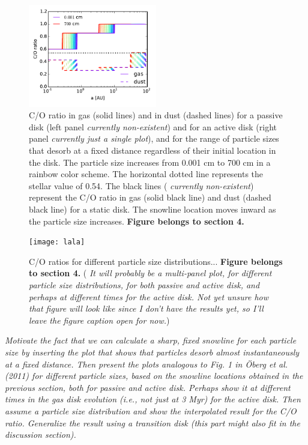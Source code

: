 \documentclass[apj]{emulateapj}
\newcommand{\emgr}[1]{\emph{ \color{gray} #1}}
\begin{document}
\begin{figure}[h!]
\centering
\includegraphics[width=0.5\textwidth]{../../figs/C_O_ratio_active_disk_many.pdf}
\caption{C/O ratio in gas (solid lines) and in dust (dashed lines) for a passive disk (left panel \emgr{currently non-existent}) and for an active disk (right panel \emgr{currently just a single plot}), and for the range of particle sizes that desorb at a fixed distance regardless of their initial location in the disk. The particle size increases from 0.001 cm to 700 cm in a rainbow color scheme. The horizontal dotted line represents the stellar value of 0.54. The black lines (\emgr{currently non-existent}) represent the C/O ratio in gas (solid black line) and dust (dashed black line) for a static disk. The snowline location moves inward as the particle size increases. \textbf{Figure belongs to section 4.}}
\label{fig:CO_ratio}
\end{figure}

\begin{figure}[h!]
\centering
\texttt{[image: lala]}
\caption{C/O ratios for different particle size distributions... \textbf{Figure belongs to section 4.} (\emgr{It will probably be a multi-panel plot, for different particle size distributions, for both passive and active disk, and perhaps at different times for the active disk. Not yet unsure how that figure will look like since I don't have the results yet, so I'll leave the figure caption open for now.})}
\label{fig:...}
\end{figure}

\emgr{Motivate the fact that we can calculate a sharp, fixed snowline for each particle size by inserting the plot that shows that particles desorb almost instantaneously at a fixed distance.  Then present the plots analogous to Fig. 1 in \"Oberg et al. (2011) for different particle sizes, based on the snowline locations obtained in the previous section, both for passive and active disk. Perhaps show it at different times in the gas disk evolution (i.e., not just at 3 Myr) for the active disk. Then assume a particle size distribution and show the interpolated result for the C/O ratio. Generalize the result using a transition disk (this part might also fit in the discussion section).}
\end{document}
